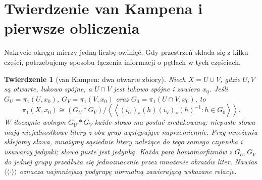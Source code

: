 \documentclass[11pt,a4paper,oneside]{report}
\theoremstyle{plain}
\newtheorem{twierdzenie}{Twierdzenie}[section]
\theoremstyle{definition}
\theoremstyle{remark}
\begin{document}
\section{Twierdzenie van Kampena i pierwsze obliczenia}
\label{sec:van-kampen}

Nakrycie okręgu mierzy jedną liczbę owinięć.
Gdy przestrzeń składa się z kilku części,
potrzebujemy sposobu łączenia informacji
o pętlach w tych częściach.

\begin{twierdzenie}[van Kampen: dwa otwarte zbiory]
\label{thm:van-kampen}
Niech $X=U\cup V$, gdzie $U,V$ są otwarte,
łukowo spójne, a $U\cap V$ jest łukowo
spójne i zawiera $x_0$. Jeśli
$G_U=\pi_1(U,x_0)$, $G_V=\pi_1(V,x_0)$
oraz $G_0=\pi_1(U\cap V,x_0)$, to
\[
 \pi_1(X,x_0)\cong
 (G_U*G_V)/
 \left\langle\!\left\langle
 (i_U)_*(h)(i_V)_*(h)^{-1}:h\in G_0
 \right\rangle\!\right\rangle.
\]
W iloczynie wolnym $G_U*G_V$ każde słowo ma postać zredukowaną:
niepuste słowa mają niejednostkowe litery z obu grup
występujące naprzemiennie. Przy mnożeniu sklejamy słowa,
mnożymy sąsiednie litery należące do tego samego czynnika i usuwamy
jedynki; słowo puste jest jedynką. Każda para homomorfizmów
z $G_U,G_V$ do jednej grupy przedłuża się jednoznacznie przez
mnożenie obrazów liter. Nawias
$\langle\!\langle\cdot\rangle\!\rangle$
oznacza najmniejszą podgrupę normalną
zawierającą wskazane relacje.
\end{twierdzenie}
\end{document}
